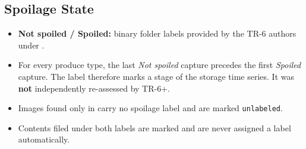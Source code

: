 \documentclass[journal]{IEEEtran}
\begin{document}
\subsection{Spoilage State}
\begin{itemize}
  \item \textbf{Not spoiled / Spoiled:} binary folder labels provided by the TR-6 authors under .
  \item For every produce type, the last \emph{Not spoiled} capture precedes the first \emph{Spoiled} capture. The label therefore marks a stage of the storage time series. It was \textbf{not} independently re-assessed by TR-6+.
  \item Images found only in  carry no spoilage label and are marked \texttt{unlabeled}.
  \item Contents filed under both labels are marked  and are never assigned a label automatically.
\end{itemize}
\end{document}
